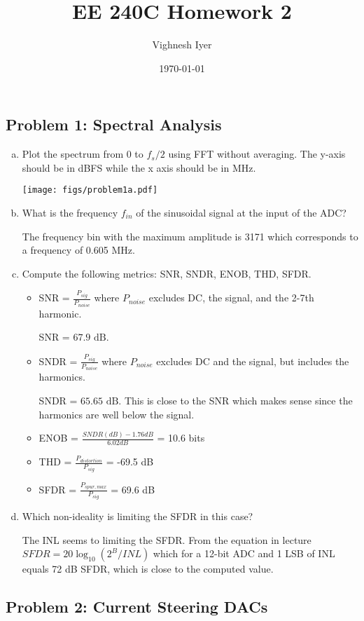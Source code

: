 \documentclass[11pt]{article}
\begin{document}
\title{EE 240C Homework 2}
\author{Vighnesh Iyer}
\date{\today}
\maketitle

\subsection*{Problem 1: Spectral Analysis}
\begin{enumerate}[a)]
    \item Plot the spectrum from 0 to $f_s/2$ using FFT without averaging. The y-axis should be in dBFS while the x axis should be in MHz.

      \begin{center}
        \texttt{[image: figs/problem1a.pdf]}
      \end{center}

    \item What is the frequency $f_{in}$ of the sinusoidal signal at the input of the ADC?

      The frequency bin with the maximum amplitude is 3171 which corresponds to a frequency of 0.605 MHz.

    \item Compute the following metrics: SNR, SNDR, ENOB, THD, SFDR.

      \begin{itemize}
        \item SNR = $\frac{P_{sig}}{P_{noise}}$ where $P_{noise}$ excludes DC, the signal, and the 2-7th harmonic.

        SNR = $67.9 \text{ dB}$.

        \item SNDR = $\frac{P_{sig}}{P_{noise}}$ where $P_{noise}$ excludes DC and the signal, but includes the harmonics.

          SNDR = $65.65 \text{ dB}$. This is close to the SNR which makes sense since the harmonics are well below the signal.

        \item ENOB = $\frac{SNDR(dB) - 1.76 dB}{6.02 dB}$ = 10.6 bits

        \item THD = $\frac{P_{distortion}}{P_{sig}}$ = -69.5 dB

        \item SFDR = $\frac{P_{spur,max}}{P_{sig}}$ = 69.6 dB
      \end{itemize}

    \item Which non-ideality is limiting the SFDR in this case?

      The INL seems to limiting the SFDR. From the equation in lecture $SFDR = 20 \log_{10}(2^B / INL)$ which for a 12-bit ADC and 1 LSB of INL equals 72 dB SFDR, which is close to the computed value.
\end{enumerate}

\subsection*{Problem 2: Current Steering DACs}
\end{document}
